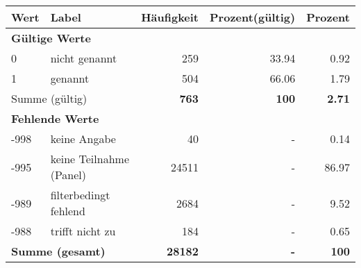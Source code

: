      \begin{longtable}{lXrrr}
     \toprule
     \textbf{Wert} & \textbf{Label} & \textbf{Häufigkeit} & \textbf{Prozent(gültig)} & \textbf{Prozent} \\
     \endhead
     \midrule
     \multicolumn{5}{l}{\textbf{Gültige Werte}}\\

     0 &
     \multicolumn{1}{X}{ nicht genannt   } &


       \num{259} &
       \num[round-mode=places,round-precision=2]{33.94} &
         \num[round-mode=places,round-precision=2]{0.92} \\

     1 &
     \multicolumn{1}{X}{ genannt   } &


       \num{504} &
       \num[round-mode=places,round-precision=2]{66.06} &
         \num[round-mode=places,round-precision=2]{1.79} \\
     \midrule
     \multicolumn{2}{l}{Summe (gültig)} &
       \textbf{\num{763}} &
     \textbf{\num{100}} &
       \textbf{\num[round-mode=places,round-precision=2]{2.71}} \\
     \multicolumn{5}{l}{\textbf{Fehlende Werte}}\\
       -998 &
       keine Angabe &
         \num{40} &
        - &
         \num[round-mode=places,round-precision=2]{0.14} \\
       -995 &
       keine Teilnahme (Panel) &
         \num{24511} &
        - &
         \num[round-mode=places,round-precision=2]{86.97} \\
       -989 &
       filterbedingt fehlend &
         \num{2684} &
        - &
         \num[round-mode=places,round-precision=2]{9.52} \\
       -988 &
       trifft nicht zu &
         \num{184} &
        - &
         \num[round-mode=places,round-precision=2]{0.65} \\
     \midrule
     \multicolumn{2}{l}{\textbf{Summe (gesamt)}} &
          \textbf{\num{28182}} &
        \textbf{-} &
        \textbf{\num{100}} \\
     \bottomrule
     \end{longtable}
     
